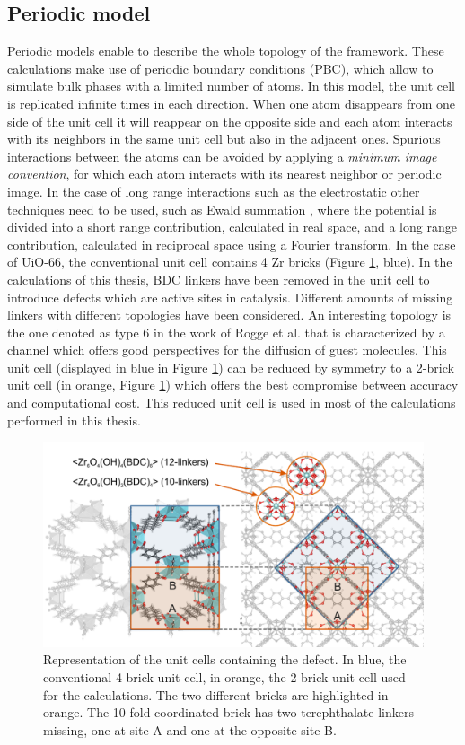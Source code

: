 \subsection*{Periodic model}
Periodic models enable to describe the whole topology of the framework. These calculations make use of periodic boundary conditions (PBC), which allow to simulate bulk phases with a limited number of atoms. In this model, the unit cell is replicated infinite times in each direction. When one atom disappears from one side of the unit cell it will reappear on the opposite side and each atom interacts with its neighbors in the same unit cell but also in the adjacent ones. Spurious interactions between the atoms can be avoided by applying a \textit{minimum image convention}, for which each atom interacts with its nearest neighbor or periodic image. In the case of long range interactions such as the electrostatic other techniques need to be used, such as Ewald summation \cite{Ewald1921}, where the potential is divided into a short range contribution, calculated in real space, and a long range contribution, calculated in reciprocal space using a Fourier transform. 
In the case of UiO-66, the conventional unit cell\cite{cavka2008new} contains 4 Zr bricks (Figure \ref{fig:periodic}, blue). In the calculations of this thesis, BDC linkers have been removed in the unit cell to introduce defects which are active sites in catalysis. Different amounts of missing linkers with different topologies have been considered. An interesting topology is the one denoted as type 6 in the work of Rogge et al.\cite{rogge2017metal} that is characterized by a channel which offers good perspectives for the diffusion of guest molecules. This unit cell (displayed in blue in Figure \ref{fig:periodic}) can be reduced by symmetry to a 2-brick unit cell (in orange, Figure \ref{fig:periodic}) which offers the best compromise between accuracy and computational cost. This reduced unit cell is used in most of the calculations performed in this thesis.

\begin{figure}[!htbp]
	\centering
 	\includegraphics[width=1.0\textwidth]{periodic}
	\caption{Representation of the unit cells containing the defect. In blue, the conventional 4-brick unit cell, in orange, the 2-brick unit cell used for the calculations. The two different bricks are highlighted in orange. The 10-fold coordinated brick has two terephthalate linkers missing, one at site A and one at the opposite site B.}
	\label{fig:periodic}
\end{figure}

